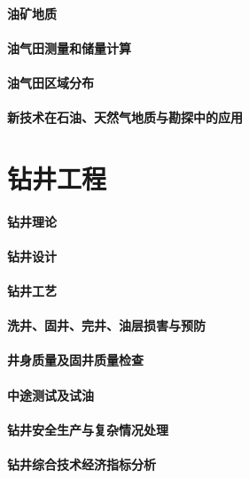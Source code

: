 \documentclass[UTF8]{../../ApplicationUniverse}
\begin{document}
\subsubsection{油矿地质}
\subsubsection{油气田测量和储量计算}
\subsubsection{油气田区域分布}
\subsubsection{新技术在石油、天然气地质与勘探中的应用}




\chapter{钻井工程}
\subsubsection{钻井理论}
\subsubsection{钻井设计}
\subsubsection{钻井工艺}
\subsubsection{洗井、固井、完井、油层损害与预防}
\subsubsection{井身质量及固井质量检查}
\subsubsection{中途测试及试油}
\subsubsection{钻井安全生产与复杂情况处理}
\subsubsection{钻井综合技术经济指标分析}
\end{document}
